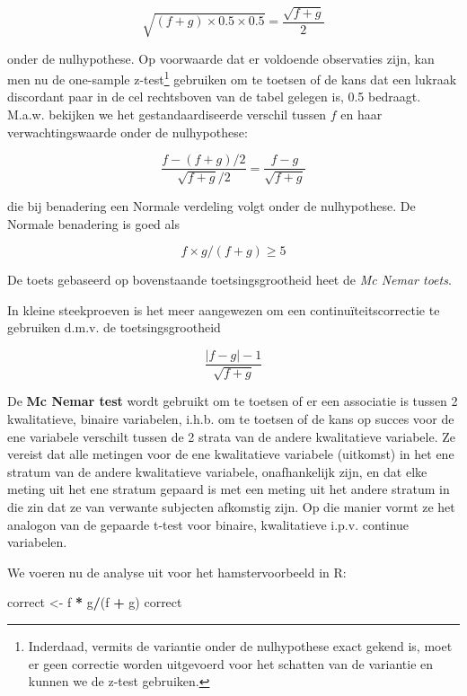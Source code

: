 \documentclass[
  12pt,dutch]{book}
\newenvironment{Shaded}{\begin{snugshade}}{\end{snugshade}}
\newcommand{\NormalTok}[1]{#1}
\newcommand{\OtherTok}[1]{\textcolor[rgb]{0.56,0.35,0.01}{#1}}
\newcommand{\SpecialCharTok}[1]{\textcolor[rgb]{0.81,0.36,0.00}{\textbf{#1}}}
\theoremstyle{definition}
\theoremstyle{definition}
\theoremstyle{definition}
\theoremstyle{definition}
\theoremstyle{remark}
\begin{document}
\begin{equation*}
\sqrt{(f+g)\times 0.5\times 0.5}=\frac{\sqrt{f+g}}{2}
\end{equation*}

onder de nulhypothese. Op voorwaarde dat er voldoende observaties zijn, kan men nu de one-sample z-test\footnote{Inderdaad, vermits de variantie onder de nulhypothese exact gekend is, moet er geen correctie worden uitgevoerd voor het schatten van de variantie en kunnen we de z-test gebruiken.}
gebruiken om te toetsen of de kans dat een lukraak discordant paar in de cel rechtsboven van de tabel
gelegen is, 0.5 bedraagt. M.a.w. bekijken we het gestandaardiseerde verschil
tussen \(f\) en haar verwachtingswaarde onder de nulhypothese:

\begin{equation*}
\frac{f-(f+g)/2}{\sqrt{f+g}/2}=\frac{f-g}{\sqrt{f+g}}
\end{equation*}

die bij benadering een Normale verdeling volgt onder de nulhypothese.
De Normale benadering is goed als

\[f \times g/(f+g) \geq 5\]

De toets gebaseerd op bovenstaande toetsingsgrootheid heet de \emph{Mc Nemar toets}.

In kleine steekproeven is het meer aangewezen om een continuïteitscorrectie te gebruiken d.m.v. de toetsingsgrootheid

\begin{equation*}
\frac{|f-g|-1}{\sqrt{f+g}}
\end{equation*}

De \textbf{Mc Nemar test} wordt gebruikt om te toetsen of er een associatie is tussen 2 kwalitatieve, binaire variabelen, i.h.b. om te toetsen of de kans op succes voor de ene variabele verschilt tussen de 2 strata van de andere kwalitatieve variabele. Ze vereist dat alle metingen voor de ene kwalitatieve variabele (uitkomst) in het ene stratum van de andere kwalitatieve variabele, onafhankelijk zijn, en dat elke meting uit het ene stratum gepaard is met een meting uit het andere stratum in die zin dat ze van verwante subjecten afkomstig zijn. Op die manier vormt ze het analogon van de gepaarde t-test voor binaire, kwalitatieve i.p.v. continue variabelen.

We voeren nu de analyse uit voor het hamstervoorbeeld in R:

\begin{Shaded}
\begin{Highlighting}[]
\NormalTok{correct }\OtherTok{\textless{}{-}}\NormalTok{ f }\SpecialCharTok{*}\NormalTok{ g}\SpecialCharTok{/}\NormalTok{(f }\SpecialCharTok{+}\NormalTok{ g)}
\NormalTok{correct}
\end{Highlighting}
\end{Shaded}
\end{document}
